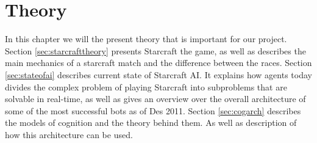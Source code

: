
\chapter{Theory}
In this chapter we will the present theory that is important for our project. Section \ref{sec:starcrafttheory} presents Starcraft the game, as well as describes the main mechanics of a starcraft match and the difference between the races. Section \ref{sec:stateofai} describes current state of Starcraft AI. It explains how agents today divides the complex problem of playing Starcraft into subproblems that are solvable in real-time, as well as gives an overview over the overall architecture of some of the most successful bots as of Des 2011. Section \ref{sec:cogarch} describes the models of cognition and the theory behind them. As well as description of how this architecture can be used. 


